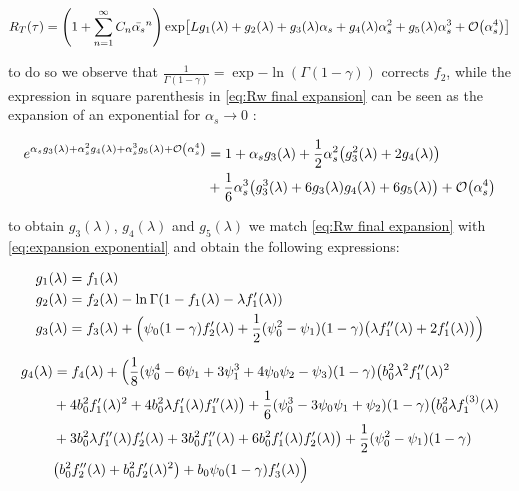 \documentclass[../main.tex]{subfiles}
\begin{document}
\begin{equation}
    R_T(\tau) = \qty(1 + \sum_{n=1}^{\infty} C_n \bar{\alpha_s}^n)\exp[L g_1(\lambda)  + g_2(\lambda) + g_3(\lambda) \alpha_s + g_4(\lambda) \alpha_s^2 + g_5(\lambda) \alpha_s^3 + \order{\alpha_s^4}]
\end{equation}

to do so we observe that $\frac{1}{\Gamma(1-\gamma)}= \exp{-\ln(\Gamma(1-\gamma))}$ corrects $f_2$, while the expression in square parenthesis in \cref{eq:Rw final expansion} can be seen 
as the expansion of an exponential for $\alpha_s \to 0$ : 

\begin{equation}
    \begin{split}\label{eq:expansion exponential}
    e^{\alpha_s g_3(\lambda) + \alpha_s^2 g_4(\lambda) + \alpha_s^3 g_5(\lambda) + \order{\alpha_s^4}} &= 1+\alpha_s g_3(\lambda)+\frac{1}{2} \alpha_s^2 \qty(g_3^2(\lambda)+2 g_4(\lambda))\\
    &+\frac{1}{6} \alpha_s^3 \qty(g_3^3(\lambda) + 6 g_3(\lambda) g_4(\lambda) + 6 g_5(\lambda))+ \order{\alpha_s^4}
    \end{split}
\end{equation}

to obtain $g_3(\lambda)$, $g_4(\lambda)$ and $g_5(\lambda)$ we match \cref{eq:Rw final expansion} with \cref{eq:expansion exponential} and obtain the following expressions:

\begin{align}
    & g_1(\lambda) = f_1(\lambda) \label{eq:g1}\\
    & g_2(\lambda) = f_2(\lambda) -  \ln \Gamma(1- f_1(\lambda)- \lambda f_1'(\lambda)) \label{eq:g2}\\
    & g_3(\lambda) = f_3(\lambda) +   \Bigl( \psi_0(1-\gamma) f_2'(\lambda )  + \frac{1}{2} (\psi_0^2-\psi_1)(1-\gamma)\bigl( \lambda  f_1''(\lambda ) +2  f_1'(\lambda )\bigr)\Bigr) \label{eq:g3}
\end{align}

\begin{align}\label{eq:g4}
    \begin{split}
        g_4(\lambda) &=  f_4(\lambda) +  \Bigl(\frac{1}{8} (\psi_0^4 -6 \psi_1 + 3\psi_1^3 +4\psi_0\psi_2 -\psi_3)(1-\gamma) \bigl(b_0^2 \lambda ^2 f_1''(\lambda )^2\\
        &+4 b_0^2 f_1'(\lambda )^2 +4 b_0^2 \lambda  f_1'(\lambda ) f_1''(\lambda )\bigr)+\frac{1}{6} (\psi_0^3 -3 \psi_0\psi_1+\psi_2)(1-\gamma) \bigl(b_0^2 \lambda  f_1^{(3)}(\lambda )\\
        &+ 3 b_0^2 \lambda  f_1''(\lambda ) f_2'(\lambda )+3 b_0^2 f_1''(\lambda )+6 b_0^2 f_1'(\lambda ) f_2'(\lambda )\bigr)+\frac{1}{2} (\psi_0^2-\psi_1)(1-\gamma)\\
        &\bigl(b_0^2 f_2''(\lambda )+b_0^2 f_2'(\lambda )^2\bigr) + b_0 \psi_0(1-\gamma) f_3'(\lambda )\Bigr)
    \end{split}
\end{align}
\end{document}
